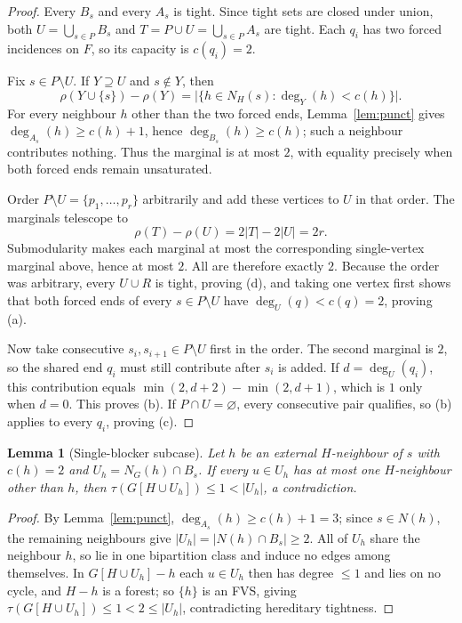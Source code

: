 \documentclass[11pt]{article}
\theoremstyle{plain}
\newtheorem{lemma}[theorem]{Lemma}
\theoremstyle{definition}
\newcommand{\FVS}{\tau}
\begin{document}
\begin{proof}
Every $B_s$ and every $A_s$ is tight.  Since tight sets are closed under union,
both $U=\bigcup_{s\in P}B_s$ and
$T=P\cup U=\bigcup_{s\in P}A_s$ are tight.
Each $q_i$ has two forced incidences on $F$, so its capacity is $c(q_i)=2$.

Fix $s\in P\setminus U$.  If $Y\supseteq U$ and $s\notin Y$, then
\[
 \rho(Y\cup\{s\})-\rho(Y)
 =\bigl|\{h\in N_H(s):\deg_Y(h)<c(h)\}\bigr|.
\]
For every neighbour $h$ other than the two forced ends,
Lemma~\ref{lem:punct} gives $\deg_{A_s}(h)\ge c(h)+1$, hence
$\deg_{B_s}(h)\ge c(h)$; such a neighbour contributes nothing.  Thus the
marginal is at most $2$, with equality precisely when both forced ends remain
unsaturated.

Order $P\setminus U=\{p_1,\ldots,p_r\}$ arbitrarily and add these vertices to
$U$ in that order.  The marginals telescope to
\[
 \rho(T)-\rho(U)=2|T|-2|U|=2r.
\]
Submodularity makes each marginal at most the corresponding single-vertex
marginal above, hence at most $2$.  All are therefore exactly $2$.  Because the
order was arbitrary, every $U\cup R$ is tight, proving (d), and taking one
vertex first shows that both forced ends of every $s\in P\setminus U$ have
$\deg_U(q)<c(q)=2$, proving (a).

Now take consecutive $s_i,s_{i+1}\in P\setminus U$ first in the order.  The
second marginal is $2$, so the shared end $q_i$ must still contribute after
$s_i$ is added.  If $d=\deg_U(q_i)$, this contribution equals
$\min(2,d+2)-\min(2,d+1)$, which is $1$ only when $d=0$.  This proves (b).
If $P\cap U=\varnothing$, every consecutive pair qualifies, so (b) applies to
every $q_i$, proving (c).
\end{proof}

\begin{lemma}[Single-blocker subcase]\label{lem:blocker}
Let $h$ be an external $H$-neighbour of $s$ with $c(h)=2$ and
$U_h=N_G(h)\cap B_s$. If every $u\in U_h$ has at most one $H$-neighbour other
than $h$, then $\FVS(G[H\cup U_h])\le1<|U_h|$, a contradiction.
\end{lemma}

\begin{proof}
By Lemma~\ref{lem:punct}, $\deg_{A_s}(h)\ge c(h)+1=3$; since $s\in N(h)$, the
remaining neighbours give $|U_h|=|N(h)\cap B_s|\ge2$. All of $U_h$ share the
neighbour $h$, so lie in one bipartition class and induce no edges among
themselves. In $G[H\cup U_h]-h$ each $u\in U_h$ then has degree $\le1$ and lies on
no cycle, and $H-h$ is a forest; so $\{h\}$ is an FVS, giving
$\FVS(G[H\cup U_h])\le1<2\le|U_h|$, contradicting hereditary tightness.
\end{proof}
\end{document}
